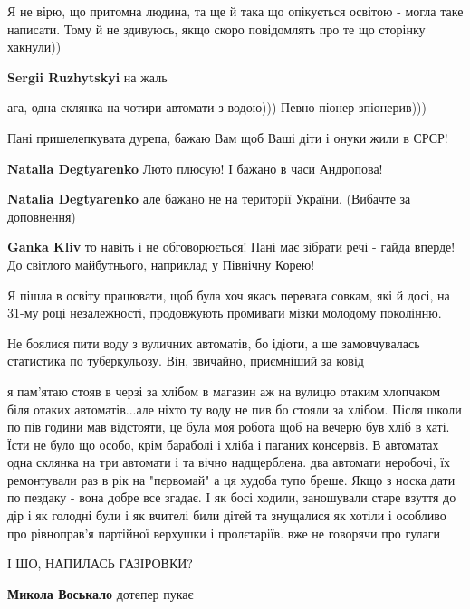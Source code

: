 \begin{itemize}
Я не вірю, що притомна людина, та ще й така що опікується освітою - могла таке написати. Тому й не здивуюсь, якщо скоро повідомлять про те що сторінку хакнули))

\textbf{Sergii Ruzhytskyi} на жаль

ага, одна склянка на чотири автомати з водою))) Певно піонер зпіонерив)))

Пані пришелепкувата дурепа, бажаю Вам щоб Ваші діти і онуки жили в СРСР!

\begin{itemize} %
\textbf{Natalia Degtyarenko}
Люто плюсую!
І бажано в часи Андропова!

\textbf{Natalia Degtyarenko} але бажано не на території України. (Вибачте за доповнення)

\textbf{Ganka Kliv} то навіть і не обговорюється! Пані має зібрати речі - гайда вперде! До світлого майбутнього, наприклад у Північну Корею!
\end{itemize} %

Я пішла в освіту працювати, щоб була хоч якась перевага совкам, які й досі, на 31-му році незалежності, продовжують промивати мізки молодому поколінню.

Не боялися пити воду з вуличних автоматів, бо ідіоти, а ще замовчувалась статистика по туберкульозу. Він, звичайно, приємніший за ковід


я пам'ятаю стояв в черзі за хлібом в магазин аж на вулицю отаким хлопчаком біля
отаких автоматів...але ніхто ту воду не пив бо стояли за хлібом. Після школи по
пів години мав відстояти, це була моя робота щоб на вечерю був хліб в хаті.
Їсти не було що особо, крім бараболі і хліба і паганих консервів. В автоматах
одна склянка на три автомати і та вічно надщерблена. два автомати неробочі, їх
ремонтували раз в рік на "пєрвомай" а ця худоба тупо бреше. Якщо з носка дати
по пездаку - вона добре все згадає. І як босі ходили, заношували старе взуття
до дір і як голодні були і як вчителі били дітей та знущалися як хотіли і
особливо про рівноправ'я партійної верхушки і пролєтаріїв. вже не говорячи про
гулаги

І ШО, НАПИЛАСЬ ГАЗІРОВКИ?

\begin{itemize} %
\textbf{Микола Воськало} дотепер пукає
\end{itemize} %


\end{itemize}
